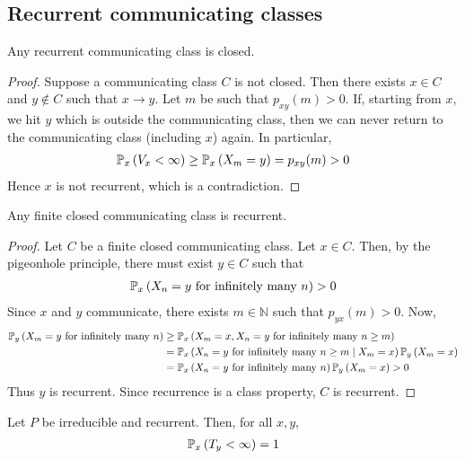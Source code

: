 \subsection{Recurrent communicating classes}
\begin{theorem}
	Any recurrent communicating class is closed.
\end{theorem}
\begin{proof}
	Suppose a communicating class $C$ is not closed.
	Then there exists $x \in C$ and $y \not\in C$ such that $x \to y$.
	Let $m$ be such that $p_{xy}(m) > 0$.
	If, starting from $x$, we hit $y$ which is outside the communicating class, then we can never return to the communicating class (including $x$) again.
	In particular,
	\begin{align*}
		\mathbb{P}_{x}\left({V_x < \infty}\right) \geq \mathbb{P}_{x}\left({X_m = y}\right) = p_{xy}(m) > 0
	\end{align*}
	Hence $x$ is not recurrent, which is a contradiction.
\end{proof}
\begin{theorem}
	Any finite closed communicating class is recurrent.
\end{theorem}
\begin{proof}
	Let $C$ be a finite closed communicating class.
	Let $x \in C$.
	Then, by the pigeonhole principle, there must exist $y \in C$ such that
	\begin{align*}
		\mathbb{P}_{x}\left({X_n = y \text{ for infinitely many } n}\right) > 0
	\end{align*}
	Since $x$ and $y$ communicate, there exists $m \in \mathbb N$ such that $p_{yx}(m) > 0$.
	Now,
	\begin{align*}
		\mathbb{P}_{y}\left({X_m = y \text{ for infinitely many } n}\right) & \geq \mathbb{P}_{x}\left({X_m = x, X_n = y \text{ for infinitely many } n \geq m}\right)                   \\
		                                                 & =\mathbb{P}_{x}\left({X_n = y \text{ for infinitely many } n \geq m \mid X_m = x}\right) \mathbb{P}_{y}\left({X_m = x}\right) \\
		                                                 & =\mathbb{P}_{x}\left({X_n = y \text{ for infinitely many } n}\right) \mathbb{P}_{y}\left({X_m = x}\right) > 0
	\end{align*}
	Thus $y$ is recurrent.
	Since recurrence is a class property, $C$ is recurrent.
\end{proof}
\begin{theorem}
	Let $P$ be irreducible and recurrent.
	Then, for all $x, y$,
	\begin{align*}
		\mathbb{P}_{x}\left({T_y < \infty}\right) = 1
	\end{align*}
\end{theorem}
